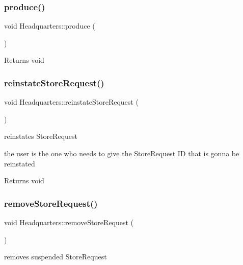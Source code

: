 \subsubsection{\texorpdfstring{produce()}{produce()}}
{\footnotesize\ttfamily void Headquarters\+::produce (\begin{DoxyParamCaption}{ }\end{DoxyParamCaption})}

\begin{DoxyReturn}{Returns}
void 
\end{DoxyReturn}
\mbox{\label{class_headquarters_a24447bf2bad345696c27ed6e9bee0ebc}} 
\subsubsection{\texorpdfstring{reinstate\+Store\+Request()}{reinstateStoreRequest()}}
{\footnotesize\ttfamily void Headquarters\+::reinstate\+Store\+Request (\begin{DoxyParamCaption}{ }\end{DoxyParamCaption})}



reinstates Store\+Request 

the user is the one who needs to give the Store\+Request ID that is gonna be reinstated

\begin{DoxyReturn}{Returns}
void 
\end{DoxyReturn}
\mbox{\label{class_headquarters_abde45af2d9335adde7f61dc30ced4995}} 
\subsubsection{\texorpdfstring{remove\+Store\+Request()}{removeStoreRequest()}}
{\footnotesize\ttfamily void Headquarters\+::remove\+Store\+Request (\begin{DoxyParamCaption}{ }\end{DoxyParamCaption})}



removes suspended Store\+Request 

